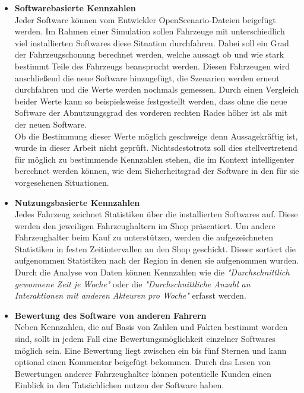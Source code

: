 \begin{itemize}
	\item[] \hspace{-0.6cm} \textbf{Softwarebasierte Kennzahlen}\\
	Jeder Software können vom Entwickler OpenScenario-Dateien beigefügt werden. Im Rahmen einer Simulation sollen Fahrzeuge mit unterschiedlich viel installierten Softwares diese Situation durchfahren. Dabei soll ein Grad der Fahrzeugschonung berechnet werden, welche aussagt ob und wie stark bestimmt Teile des Fahrzeugs beansprucht werden. Diesen Fahrzeugen wird anschließend die neue Software hinzugefügt, die Szenarien werden erneut durchfahren und die Werte werden nochmals gemessen. Durch einen Vergleich beider Werte kann so beispielsweise festgestellt werden, dass ohne die neue Software der Abnutzungsgrad des vorderen rechten Rades höher ist als mit der neuen Software.\\
	Ob die Bestimmung dieser Werte möglich geschweige denn Aussagekräftig ist, wurde in dieser Arbeit nicht geprüft. Nichtsdestotrotz soll dies stellvertretend für möglich zu bestimmende Kennzahlen stehen, die im Kontext intelligenter berechnet werden können, wie dem Sicherheitsgrad der Software in den für sie vorgesehenen Situationen.
	\item[] \hspace{-0.6cm} \textbf{Nutzungsbasierte Kennzahlen}\\
	Jedes Fahrzeug zeichnet Statistiken über die installierten Softwares auf. Diese werden den jeweiligen Fahrzeughaltern im Shop präsentiert. Um andere Fahrzeughalter beim Kauf zu unterstützen, werden die aufgezeichneten Statistiken in festen Zeitintervallen an den Shop geschickt. Dieser sortiert die aufgenommen Statistiken nach der Region in denen sie aufgenommen wurden. Durch die Analyse von Daten können Kennzahlen wie die \textit{"Durchschnittlich gewonnene Zeit je Woche"} oder die \textit{"Durchschnittliche Anzahl an Interaktionen mit anderen Akteuren pro Woche"} erfasst werden.
	\item[] \hspace{-0.6cm} \textbf{Bewertung des Software von anderen Fahrern}\\
	Neben Kennzahlen, die auf Basis von Zahlen und Fakten bestimmt worden sind, sollt in jedem Fall eine Bewertungsmöglichkeit einzelner Softwares möglich sein. Eine Bewertung liegt zwischen ein bis fünf Sternen und kann optional einen Kommentar beigefügt bekommen. Durch das Lesen von Bewertungen anderer Fahrzeughalter können potentielle Kunden einen Einblick in den Tatsächlichen nutzen der Software haben.
\end{itemize}

